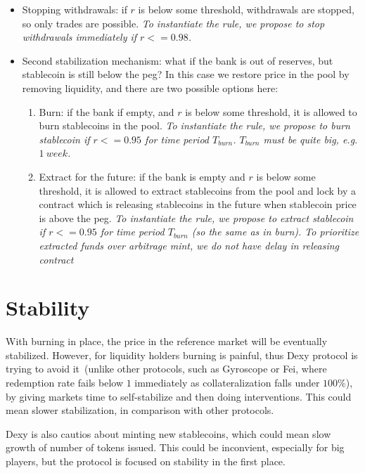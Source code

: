 \documentclass{article}   %
\newcommand{\sct}{stablecoin}
\newcommand{\dx}{Dexy}
\begin{document}
\begin{itemize}
   \item{Stopping withdrawals: } if $r$ is below some threshold, withdrawals are stopped, so only trades are possible.  
   \em{To instantiate the rule, we propose to stop withdrawals immediately if $r <= 0.98$.}

   \item{Second stabilization mechanism: } what if the bank is out of reserves, but \sct{} is still below the peg? In this case we restore price in the pool by removing liquidity, and there are two possible options here:

   \begin{enumerate}
   \item{Burn: } if the bank if empty, and $r$ is below some threshold, it is allowed to burn \sct{}s in the pool. 
   \em{To instantiate the rule, we propose to burn \sct{} if $r <= 0.95$ for time period $T_{burn}$. $T_{burn}$ must be quite big, e.g. $1 {\ week}$.}

   \item{Extract for the future: } if the bank is empty and $r$ is below some threshold, it is allowed to extract \sct{}s from the pool and lock by a contract which is releasing \sct{}s in the future when \sct{} price is above the peg.
   \em{To instantiate the rule, we propose to extract \sct{} if $r <= 0.95$ for time period $T_{burn}$ (so the same as in burn). 
   To prioritize extracted funds over arbitrage mint, we do not have delay in releasing contract}
   \end{enumerate}
\end{itemize} 

\section{Stability}

With burning in place, the price in the reference market will be eventually stabilized. However, for liquidity holders burning is painful, thus \dx{} protocol is trying to avoid it~(unlike other protocols, such as Gyroscope or Fei, where redemption rate fails below $1$ immediately as collateralization falls under $100\%$), by giving markets time to self-stabilize and then doing interventions. This could mean slower stabilization, in comparison with other protocols.

\dx{} is also cautios about minting new \sct{}s, which could mean slow growth of number of tokens issued. This could be inconvient, especially for big players, but the protocol is focused on stability in the first place.   
\end{document}
